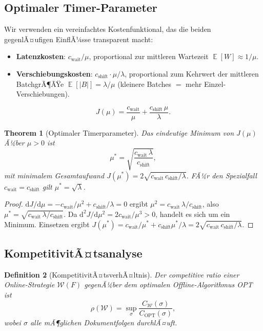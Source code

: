 ﻿\documentclass[12pt, a4paper]{article}
\newtheorem{theorem}{Theorem}[section]
\newtheorem{definition}[theorem]{Definition}
\DeclareMathOperator{\E}{\mathbb{E}}
\begin{document}
\subsection{Optimaler Timer-Parameter}\label{subsec:optparam}

Wir verwenden ein vereinfachtes Kostenfunktional, das die beiden
gegenlÃ¤ufigen EinflÃ¼sse transparent macht:
\begin{itemize}[noitemsep]
  \item \textbf{Latenzkosten}: $c_{\mathrm{wait}}/\mu$, proportional zur
        mittleren Wartezeit $\E[W] \approx 1/\mu$.
  \item \textbf{Verschiebungskosten}: $c_{\mathrm{shift}} \cdot \mu/\lambda$,
        proportional zum Kehrwert der mittleren BatchgrÃ¶ÃŸe
        $\E[|B|] = \lambda/\mu$ (kleinere Batches $=$ mehr Einzel-Verschiebungen).
\end{itemize}
\[
  J(\mu) = \frac{c_{\mathrm{wait}}}{\mu} + \frac{c_{\mathrm{shift}}\,\mu}{\lambda}.
\]

\begin{theorem}[Optimaler Timerparameter]\label{thm:optmu}
Das eindeutige Minimum von $J(\mu)$ Ã¼ber $\mu > 0$ ist
\[
  \mu^* = \sqrt{\frac{c_{\mathrm{wait}}\,\lambda}{c_{\mathrm{shift}}}},
\]
mit minimalem Gesamtaufwand $J(\mu^*) = 2\sqrt{c_{\mathrm{wait}}\,c_{\mathrm{shift}}/\lambda}$.
FÃ¼r den Spezialfall $c_{\mathrm{wait}} = c_{\mathrm{shift}}$ gilt $\mu^* = \sqrt{\lambda}$.
\end{theorem}

\begin{proof}
$\mathrm{d}J/\mathrm{d}\mu = -c_{\mathrm{wait}}/\mu^2 + c_{\mathrm{shift}}/\lambda = 0$
ergibt $\mu^2 = c_{\mathrm{wait}}\,\lambda/c_{\mathrm{shift}}$, also
$\mu^* = \sqrt{c_{\mathrm{wait}}\,\lambda/c_{\mathrm{shift}}}$.
Da $\mathrm{d}^2J/\mathrm{d}\mu^2 = 2c_{\mathrm{wait}}/\mu^3 > 0$, handelt es sich um ein Minimum.
Einsetzen ergibt $J(\mu^*) = c_{\mathrm{wait}}/\mu^* + c_{\mathrm{shift}}\mu^*/\lambda = 2\sqrt{c_{\mathrm{wait}}\,c_{\mathrm{shift}}/\lambda}$.
\end{proof}

\subsection{KompetitivitÃ¤tsanalyse}\label{subsec:competitive}

\begin{definition}[KompetitivitÃ¤tsverhÃ¤ltnis]\label{def:competitive}
Der \emph{competitive ratio} einer Online-Strategie $\mathcal{W}(F)$ gegenÃ¼ber
dem optimalen Offline-Algorithmus OPT ist
\[
  \rho(\mathcal{W}) = \sup_\sigma \frac{C_{\mathcal{W}}(\sigma)}{C_{\mathrm{OPT}}(\sigma)},
\]
wobei $\sigma$ alle mÃ¶glichen Dokumentfolgen durchlÃ¤uft.
\end{definition}
\end{document}
